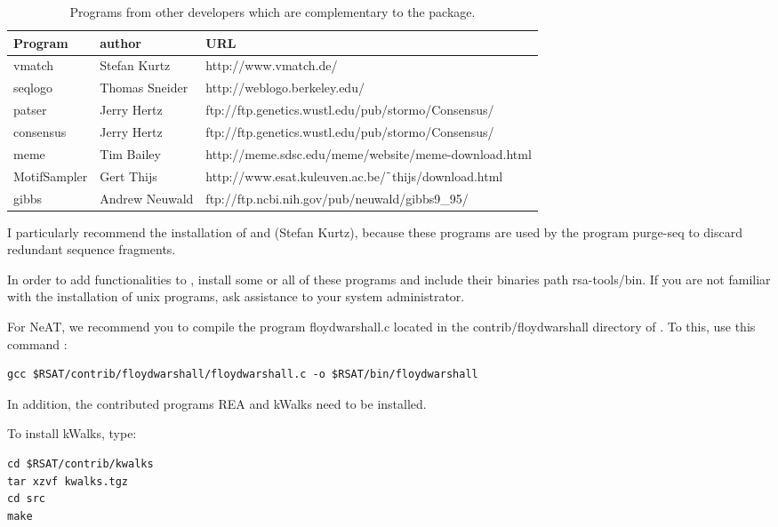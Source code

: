 \documentclass{book}
\begin{document}
\begin{table}
\begin{center}
\begin{tabular}{lll}
\hline
Program & author  & URL \\
\hline
vmatch & Stefan Kurtz & http://www.vmatch.de/ \\
seqlogo & Thomas Sneider & http://weblogo.berkeley.edu/ \\
patser & Jerry Hertz & ftp://ftp.genetics.wustl.edu/pub/stormo/Consensus/ \\
consensus & Jerry Hertz &  ftp://ftp.genetics.wustl.edu/pub/stormo/Consensus/ \\
meme & Tim Bailey & http://meme.sdsc.edu/meme/website/meme-download.html \\
MotifSampler & Gert Thijs & http://www.esat.kuleuven.ac.be/$\tilde{\hspace{0.4em}}$thijs/download.html \\
gibbs & Andrew Neuwald & ftp://ftp.ncbi.nih.gov/pub/neuwald/gibbs9\_95/ \\
\hline
\end{tabular}
\end{center}
\caption{\label{table:other_programs} Programs from other developers
  which are complementary to the \RSAT package.}
\end{table}

I particularly recommend the installation of  and
 (Stefan Kurtz), because these programs are used by
the program purge-seq to discard redundant sequence fragments.

In order to add functionalities to \RSAT, install some or all of these
programs and include their binaries path rsa-tools/bin. If you are not
familiar with the installation of unix programs, ask assistance to
your system administrator.

For NeAT, we recommend you to compile the program floydwarshall.c located in the contrib/floydwarshall directory of \RSAT. To this, use this command :

\begin{verbatim}
gcc $RSAT/contrib/floydwarshall/floydwarshall.c -o $RSAT/bin/floydwarshall
\end{verbatim}

In addition, the contributed programs REA and kWalks need to be installed.

To install kWalks, type:

\begin{verbatim}
cd $RSAT/contrib/kwalks
tar xzvf kwalks.tgz
cd src
make
\end{verbatim}
\end{document}
